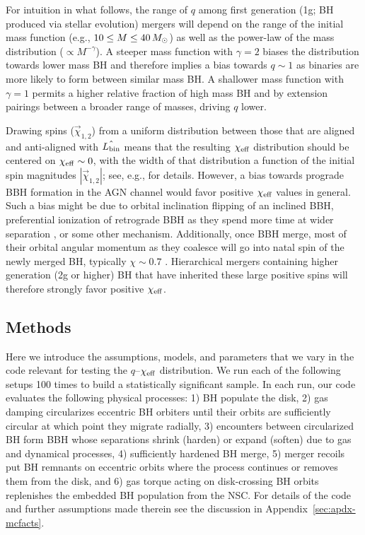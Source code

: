 For intuition in what follows, the range of $q$ among first generation (1g; BH produced via stellar evolution) mergers will depend on the range of the initial mass function (e.g., $10\leq M \leq 40\,M_{\odot}$) as well as the power-law of the mass distribution ($\propto M^{-\gamma}$).
A steeper mass function with $\gamma = 2$ biases the distribution towards lower mass BH and therefore implies a bias towards $q \sim 1$ as binaries are more likely to form between similar mass BH.
A shallower mass function with $\gamma = 1$ permits a higher relative fraction of high mass BH and by extension pairings between a broader range of masses, driving $q$ lower.

Drawing spins ($\vec{\chi}_{1,2}$) from a uniform distribution between those that are aligned and anti-aligned with $\hat{L_{\rm bin}}$ means that the resulting $\chi_{\rm eff}$ distribution should be centered on $\chi_{\rm eff} \sim 0$, with the width of that distribution a function of the initial spin magnitudes $|\vec{\chi}_{1,2}|$; see, e.g., \cite{Callister21} for details.
However, a bias towards prograde BBH formation in the AGN channel would favor positive $\chi_{\rm eff}$ values in general.
Such a bias might be due to orbital inclination flipping \citep{DittmannDempseyLi24} of an inclined BBH, preferential ionization of retrograde BBH as they spend more time at wider separation \citep[on average,][]{Wang+21,Calcino+23}, or some other mechanism.
Additionally, once BBH merge, most of their orbital angular momentum as they coalesce will go into natal spin of the newly merged BH, typically $\chi \sim 0.7$ \citep{TichyMarronetti08}.
Hierarchical mergers containing higher generation (2g or higher) BH that have inherited these large positive spins will therefore strongly favor positive $\chi_{\rm eff}$.



\subsection{Methods}
\label{sec:methods-qxeff}

Here we introduce the assumptions, models, and parameters that we vary in the  code relevant for testing the $q$--$\chi_{\rm eff}$ distribution.
We run each of the following setups 100 times to build a statistically significant sample.
In each run, our code evaluates the following physical processes: 1) BH populate the disk, 2) gas damping circularizes eccentric BH orbiters until their orbits are sufficiently circular at which point they migrate radially, 3) encounters between circularized BH form BBH whose separations shrink (harden) or expand (soften) due to gas and dynamical processes, 4) sufficiently hardened BH merge, 5) merger recoils put BH remnants on eccentric orbits where the process continues or removes them from the disk, and 6) gas torque acting on disk-crossing BH orbits replenishes the embedded BH population from the NSC.
For details of the code and further assumptions made therein see the discussion in Appendix~\ref{sec:apdx-mcfacts}.

